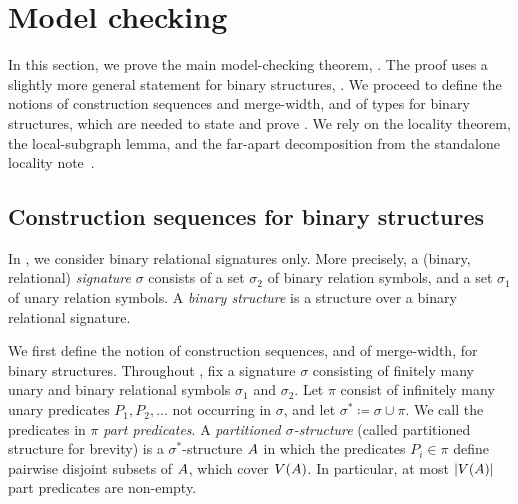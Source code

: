 \section{Model checking}\label{sec:mc}
In this section, we prove the main model-checking theorem, .
The proof uses a slightly more general statement for binary structures, .
We proceed to define the notions of construction sequences and merge-width, and of types for binary structures, which are needed to state and prove .
We rely on the locality theorem, the local-subgraph lemma, and the far-apart decomposition from the standalone locality note~\cite{locality-note}.



\subsection{Construction sequences for binary structures}\label{sec:computing}
\newcommand{\merge}[2]{\mathrm{merge}_{#1,#2}}
\newcommand{\resolve}[3]{\mathrm{resolve}^{#1}_{#2,#3}}
In , we consider binary relational signatures only.
More precisely, a (binary, relational) \emph{signature} $\sigma$ consists of a set $\sigma_2$ of binary relation symbols, and a set $\sigma_1$ of unary relation symbols.
A \emph{binary structure} is a structure over a binary relational signature.



We first define the notion of construction sequences, and of merge-width, for binary structures.
Throughout , fix a signature $\sigma$
consisting of finitely many unary and binary relational symbols \(\sigma_1\) and \(\sigma_2\).
Let $\pi$ consist of infinitely many unary predicates $P_1,P_2,\ldots$ not occurring in $\sigma$,
and let $\sigma^*\coloneqq\sigma\cup\pi$.
We call the predicates in $\pi$ \emph{part predicates}.
A \emph{partitioned $\sigma$-structure} (called partitioned structure for brevity)
is a $\sigma^*$-structure ${{A}}$ in which
the predicates $P_i\in\pi$ define pairwise disjoint subsets of ${{A}}$, which cover $V({{A}})$.
In particular, at most $|V({{A}})|$ part predicates are non-empty.



